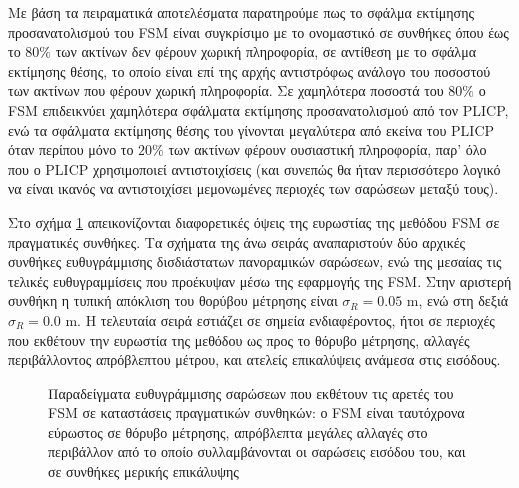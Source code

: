 Με βάση τα πειραματικά αποτελέσματα παρατηρούμε πως το σφάλμα εκτίμησης
προσανατολισμού του FSM είναι συγκρίσιμο με το ονομαστικό σε συνθήκες
όπου έως το $80\%$ των ακτίνων δεν φέρουν χωρική πληροφορία, σε αντίθεση με το
σφάλμα εκτίμησης θέσης, το οποίο είναι επί της αρχής αντιστρόφως ανάλογο του
ποσοστού των ακτίνων που φέρουν χωρική πληροφορία. Σε χαμηλότερα ποσοστά του
$80\%$ ο FSM επιδεικνύει χαμηλότερα σφάλματα εκτίμησης προσανατολισμού
από τον PLICP, ενώ τα σφάλματα εκτίμησης θέσης του γίνονται μεγαλύτερα από
εκείνα του PLICP όταν περίπου μόνο το $20\%$ των ακτίνων φέρουν ουσιαστική
πληροφορία, παρ' όλο που ο PLICP χρησιμοποιεί αντιστοιχίσεις (και συνεπώς θα
ήταν περισσότερο λογικό να είναι ικανός να αντιστοιχίσει μεμονωμένες περιοχές
των σαρώσεων μεταξύ τους).

Στο σχήμα \ref{fig:02_05_04:05} απεικονίζονται διαφορετικές όψεις της ευρωστίας
της μεθόδου FSM σε πραγματικές συνθήκες. Τα σχήματα της άνω σειράς
αναπαριστούν δύο αρχικές συνθήκες ευθυγράμμισης δισδιάστατων πανοραμικών
σαρώσεων, ενώ της μεσαίας τις τελικές ευθυγραμμίσεις που προέκυψαν μέσω της
εφαρμογής της FSM. Στην αριστερή συνθήκη η τυπική απόκλιση του θορύβου
μέτρησης είναι $\sigma_R = 0.05$ m, ενώ στη δεξιά $\sigma_R = 0.0$ m. Η
τελευταία σειρά εστιάζει σε σημεία ενδιαφέροντος, ήτοι σε περιοχές που εκθέτουν
την ευρωστία της μεθόδου ως προς το θόρυβο μέτρησης, αλλαγές περιβάλλοντος
απρόβλεπτου μέτρου, και ατελείς επικαλύψεις ανάμεσα στις εισόδους.

\begin{figure}[]\centering
  
  \vspace{-1cm}
  \caption{\small Παραδείγματα ευθυγράμμισης σαρώσεων που εκθέτουν τις αρετές
           του FSM σε καταστάσεις πραγματικών συνθηκών: ο FSM
           είναι ταυτόχρονα εύρωστος σε θόρυβο μέτρησης, απρόβλεπτα μεγάλες
           αλλαγές στο περιβάλλον από το οποίο συλλαμβάνονται οι σαρώσεις
           εισόδου του, και σε συνθήκες μερικής επικάλυψης}
  \label{fig:02_05_04:05}
\end{figure}

